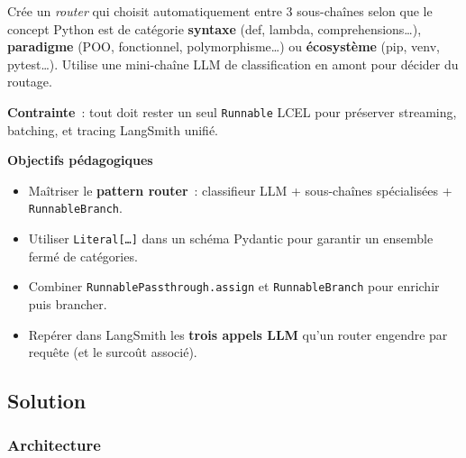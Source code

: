\documentclass[11pt,a4paper]{article}
\begin{document}
\begin{tcolorbox}[title=Exercice bonus 4. Aiguillage dynamique vers 3 sous-chaînes spécialisées]
Crée un \emph{router} qui choisit automatiquement entre 3 sous-chaînes
selon que le concept Python est de catégorie \textbf{syntaxe} (def, lambda,
comprehensions\dots), \textbf{paradigme} (POO, fonctionnel,
polymorphisme\dots) ou \textbf{écosystème} (pip, venv, pytest\dots).
Utilise une mini-chaîne LLM de classification en amont pour décider du
routage.

\textbf{Contrainte}~: tout doit rester un seul \texttt{Runnable} LCEL
pour préserver streaming, batching, et tracing LangSmith unifié.

\bigskip
\noindent\textbf{Objectifs pédagogiques}
\begin{itemize}[leftmargin=*]
  \item Maîtriser le \textbf{pattern router}~: classifieur LLM + sous-chaînes
        spécialisées + \texttt{RunnableBranch}.
  \item Utiliser \texttt{Literal[\dots]} dans un schéma Pydantic pour
        garantir un ensemble fermé de catégories.
  \item Combiner \texttt{RunnablePassthrough.assign} et
        \texttt{RunnableBranch} pour enrichir puis brancher.
  \item Repérer dans LangSmith les \textbf{trois appels LLM} qu'un router
        engendre par requête (et le surcoût associé).
\end{itemize}
\end{tcolorbox}

\subsection{Solution}

\subsubsection{Architecture}

\begin{center}
\end{center}
\end{document}
